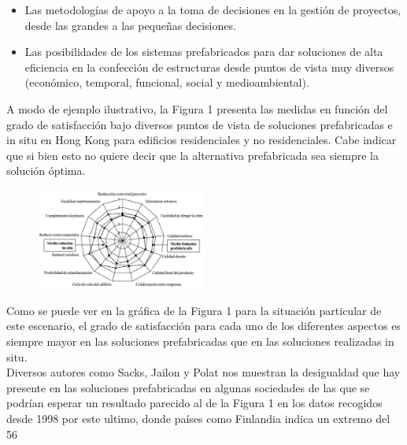 \documentclass[10pt]{article}
\begin{document}
\begin{itemize}
	
	\item Las metodologías de apoyo a la toma de decisiones en la gestión de proyectos, desde las grandes a las pequeñas decisiones.
	
	\item Las posibilidades de los sistemas prefabricados para dar soluciones de alta eficiencia en la confección de estructuras desde puntos de vista muy diversos (económico, temporal, funcional, social y medioambiental).

\end{itemize}

A modo de ejemplo ilustrativo, la Figura 1 presenta las medidas en función del grado de satisfacción bajo diversos puntos de vista de soluciones prefabricadas e in situ en Hong Kong para edificios residenciales y no residenciales. Cabe indicar que si bien esto no quiere decir que la alternativa prefabricada sea siempre la solución óptima.\\

\begin{figure}[H]
	\begin{center}
 		\includegraphics[width = 0.5\textwidth]{Imagenes/comparacion.eps}
	\end{center} 
\end{figure}

Como se puede ver en la gráfica de la Figura 1 para la situación particular de este escenario, el grado de satisfacción para cada uno de los diferentes aspectos es siempre mayor en las soluciones prefabricadas que en las soluciones realizadas in situ.\\

	Diversos autores como Sacks, Jailon y Polat nos muestran la desigualdad que hay presente en las soluciones prefabricadas en algunas sociedades de las que se podrían esperar un resultado parecido al de la Figura 1 en los datos recogidos desde 1998 por este ultimo, donde  países como Finlandia indica un extremo del 56%
\end{document}

